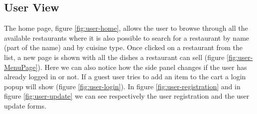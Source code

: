 \subsection{User View}


The home page, figure \ref{fig:user-home}, allows the user to browse through all the available restaurants where it is also possible to search for a restaurant by name (part of the name) and by cuisine type. Once clicked on a restaurant from the list, a new page is shown with all the dishes a restaurant can sell (figure  \ref{fig:user-MenuPage}). Here we can also notice how the side panel changes if the user has already logged in or not. If a guest user tries to add an item to the cart a login popup will show (figure \ref{fig:user-login}). In figure  \ref{fig:user-registration} and in figure  \ref{fig:user-update} we can see respectively the user registration and the user update forms.

\begin{center}
	\label{fig:user-home}
\end{center}


\begin{center}
	\label{fig:user-MenuPage}    
\end{center}


